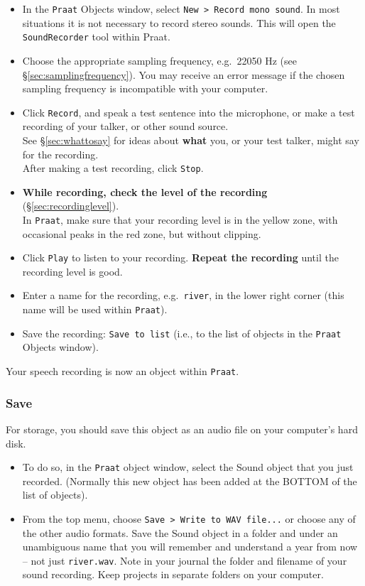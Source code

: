 \documentclass[
]{book}
\begin{document}
\begin{itemize}
\item
  In the \texttt{Praat} Objects window, select \texttt{New\ \textgreater{}\ Record\ mono\ sound}.
  In most situations it is not necessary to record stereo sounds. This will open the \texttt{SoundRecorder} tool within Praat.
\item
  Choose the appropriate sampling frequency, e.g.~22050 Hz (see §\ref{sec:samplingfrequency}). You may receive an error message if the chosen sampling frequency is incompatible with your computer.
\item
  Click \texttt{Record}, and speak a test sentence into the microphone, or make a test recording of your talker, or other sound source.\\
  See §\ref{sec:whattosay} for ideas about \textbf{what} you, or your test talker, might say for the recording.\\
  After making a test recording, click \texttt{Stop}.
\item
  \textbf{While recording, check the level of the recording} (§\ref{sec:recordinglevel}).\\
  In \texttt{Praat}, make sure that your recording level is in the yellow zone, with occasional peaks in the red zone, but without clipping.
\item
  Click \texttt{Play} to listen to your recording. \textbf{Repeat the recording} until the recording level is good.
\item
  Enter a name for the recording, e.g.~\texttt{river}, in the lower right corner (this name will be used within \texttt{Praat}).
\item
  Save the recording: \texttt{Save\ to\ list} (i.e., to the list of objects in the \texttt{Praat} Objects window).
\end{itemize}

Your speech recording is now an object within \texttt{Praat}.

\subsubsection{Save}\label{sec:praatsave}

For storage, you should save this object as an audio file on your computer's hard disk.

\begin{itemize}
\item
  To do so, in the \texttt{Praat} object window, select the Sound object that you just recorded. (Normally this new object has been added at the BOTTOM of the list of objects).
\item
  From the top menu, choose \texttt{Save\ \textgreater{}\ Write\ to\ WAV\ file...} or choose any of the other audio formats. Save the Sound object in a folder and under an unambiguous name that you will remember and understand a year from now -- not just \texttt{river.wav}. Note in your journal the folder and filename of your sound recording. Keep projects in separate folders on your computer.
\end{itemize}
\end{document}
